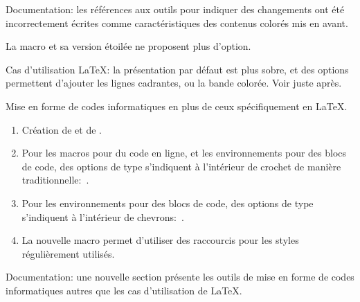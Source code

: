\begin{tdocfix}
	\item Documentation: les références aux outils pour indiquer des changements ont été incorrectement écrites comme caractéristiques des contenus colorés mis en avant.
\end{tdocfix}


\begin{tdocbreak}
	\item La macro  et sa version étoilée ne proposent plus d'option.

	\item Cas d'utilisation \LaTeX: la présentation par défaut est plus sobre, et des options permettent d'ajouter les lignes cadrantes, ou la bande colorée. Voir juste après.
\end{tdocbreak}


\begin{tdocnew}
	\item Mise en forme de codes informatiques en plus de ceux spécifiquement en \LaTeX.
	\begin{enumerate}
		\item Création de  et de .

		\item Pour les macros pour du code en ligne, et les environnements pour des blocs de code, des options de type  s'indiquent à l'intérieur de crochet de manière traditionnelle: \,.

		\item Pour les environnements pour des blocs de code, des options de type  s'indiquent à l'intérieur de chevrons: \,.

		\item La nouvelle macro  permet d'utiliser des raccourcis pour les styles  régulièrement utilisés.
	\end{enumerate}

	\item Documentation: une nouvelle section présente les outils de mise en forme de codes informatiques autres que les cas d'utilisation de \LaTeX.
\end{tdocnew}


